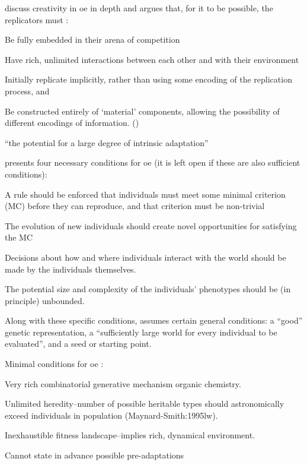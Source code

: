 \begin{DRAFT}
\Textcite{Taylor2001,Taylor:1999sc} discuss creativity in \gls{oe} in depth and argues that, for it to be possible, the replicators must \parencite{Hutton2004}:
\begin{compactenum}
	\item Be fully embedded in their arena of competition 
	\item Have rich, unlimited interactions between each other and with their environment 
	\item Initially replicate implicitly, rather than using some encoding of the replication process, and 
	\item Be constructed entirely of `material' components, allowing the possibility of different encodings of information. ()
\end{compactenum}

``the potential for a large degree of intrinsic adaptation'' \parencite{Taylor2001}

\parencite{Soros2014} presents four necessary conditions for \gls{oe} (it is left open if these are also sufficient conditions):
\begin{compactenum}
	\item A rule should be enforced that individuals must meet some minimal criterion (MC) before they can reproduce, and that criterion must be non-trivial
	\item The evolution of new individuals should create novel opportunities for satisfying the MC
	\item Decisions about how and where individuals interact with the world should be made by the individuals themselves.
	\item The potential size and complexity of the individuals' phenotypes should be (in principle) unbounded.
\end{compactenum}
Along with these specific conditions, \parencite{Soros2014} assumes certain general conditions: a ``good'' genetic representation, a ``sufficiently large world for every individual to be evaluated'', and a seed or starting point.

Minimal conditions for \gls{oe} \parencite{Vasas2015}:
\begin{compactenum}
	\item Very rich combinatorial generative mechanism \eg organic chemistry.
	\item Unlimited heredity--number of possible heritable types should astronomically exceed individuals in population (Maynard-Smith:1995lw).
	\item Inexhaustible fitness landscape--implies rich, dynamical environment.
	\item Cannot state in advance possible pre-adaptations
\end{compactenum}


\end{DRAFT}
